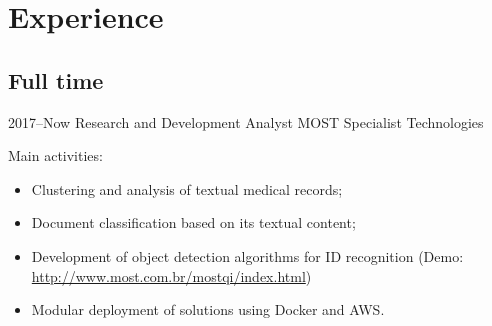 \documentclass[a4paper]{cv-friggeri-x}
\begin{document}




\section{Experience}

\subsection{Full time}

\begin{entrylist}


\entry
    {2017--Now}
    {Research and Development Analyst}
    {MOST Specialist Technologies}
    {Main activities:
    \begin{itemize}
        \item Clustering and analysis of textual medical records;
        \item Document classification based on its textual content;
        \item Development of object detection algorithms for ID recognition (Demo: \href{http://www.most.com.br/mostqi/index.html}{http://www.most.com.br/mostqi/index.html}) 
        \item Modular deployment of solutions using Docker and AWS.
    \end{itemize}}


\end{entrylist}
\end{document}
